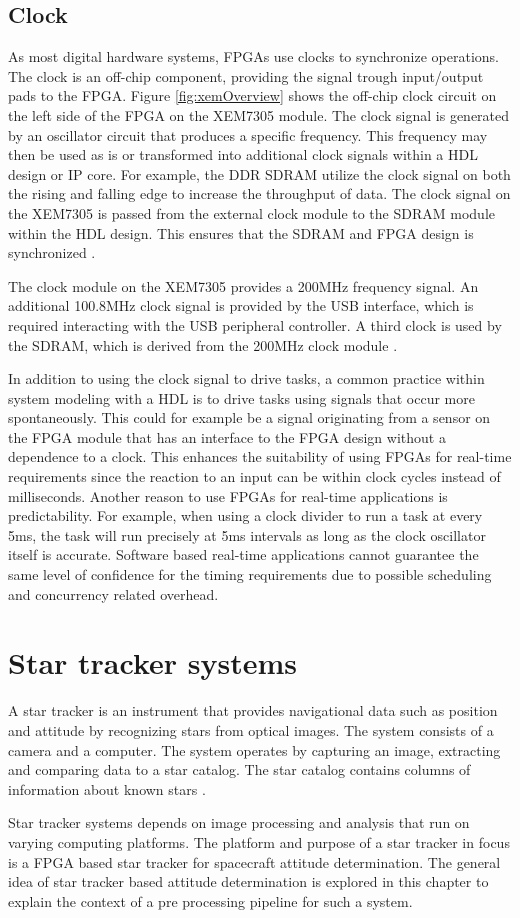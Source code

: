 \documentclass[12pt]{report}
\begin{document}
\section{Clock}
As most digital hardware systems, FPGAs use clocks to synchronize operations. The clock is an off-chip component, providing the signal trough input/output pads to the FPGA. Figure \ref{fig:xemOverview} shows the off-chip clock circuit on the left side of the FPGA on the XEM7305 module. The clock signal is generated by an oscillator circuit that produces a specific frequency. This frequency may then be used as is or transformed into additional clock signals within a HDL design or IP core. For example, the DDR SDRAM utilize the clock signal on both the rising and falling edge to increase the throughput of data. The clock signal on the XEM7305 is passed from the external clock module to the SDRAM module within the HDL design. This ensures that the SDRAM and FPGA design is synchronized \citep{XEM7305Man}.
\par
The clock module on the XEM7305 provides a 200MHz frequency signal. An additional 100.8MHz clock signal is provided by the USB interface, which is required interacting with the USB peripheral controller. A third clock is used by the SDRAM, which is derived from the 200MHz clock module \citep{XEM7305Man}.
\par
In addition to using the clock signal to drive tasks, a common practice within system modeling with a HDL is to drive tasks using signals that occur more spontaneously. This could for example be a signal originating from a sensor on the FPGA module that has an interface to the FPGA design without a dependence to a clock. This enhances the suitability of using FPGAs for real-time requirements since the reaction to an input can be within clock cycles instead of milliseconds. Another reason to use FPGAs for real-time applications is predictability. For example, when using a clock divider to run a task at every 5ms, the task will run precisely at 5ms intervals as long as the clock oscillator itself is accurate. Software based real-time applications cannot guarantee the same level of confidence for the timing requirements due to possible scheduling and concurrency related overhead.

\chapter{Star tracker systems}
A star tracker is an instrument that provides navigational data such as position and attitude by recognizing stars from optical images. The system consists of a camera and a computer. The system operates by capturing an image, extracting and comparing data to a star catalog. The star catalog contains columns of information about known stars \citep{SatDesgin}.
\par
Star tracker systems depends on image processing and analysis that run on varying computing platforms. The platform and purpose of a star tracker in focus is a FPGA based star tracker for spacecraft attitude determination. The general idea of star tracker based attitude determination is explored in this chapter to explain the context of a pre processing pipeline for such a system.
\end{document}
